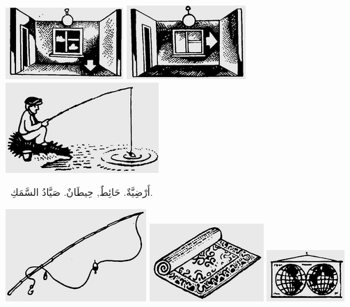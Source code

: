 \documentclass[a5paper]{article}
\begin{document}
 \includegraphics[width=1.7602in,height=1.0728in]{MuhammadBagauddinlatinized-img090.png}   \includegraphics[width=1.7811in,height=1.1043in]{MuhammadBagauddinlatinized-img091.png}   \includegraphics[width=2.2917in,height=1.3543in]{MuhammadBagauddinlatinized-img092.png} 

\ أَرْضِيَّةٌ. حَائِطٌ, حِيطَانٌ. صَيَّادُ السَّمَكِ. 

 \includegraphics[width=2.1043in,height=1.3854in]{MuhammadBagauddinlatinized-img093.png}   \includegraphics[width=1.7083in,height=1.1665in]{MuhammadBagauddinlatinized-img094.png}   \includegraphics[width=1.1665in,height=0.7709in]{MuhammadBagauddinlatinized-img095.png} 
\end{document}
